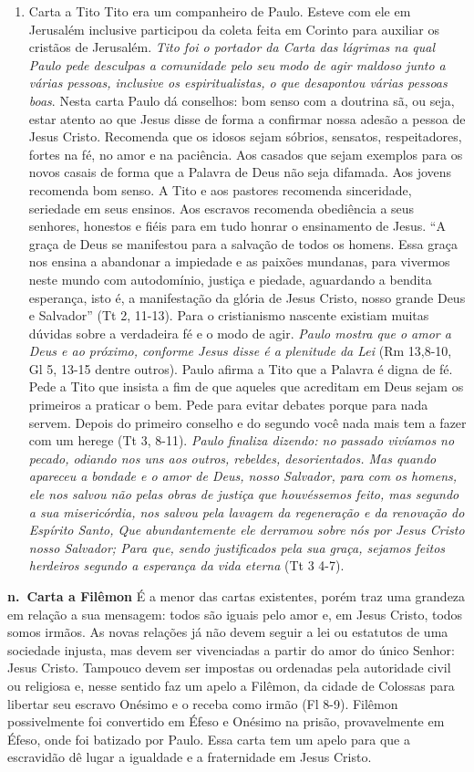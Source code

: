\documentclass[
]{book}
\begin{document}
\begin{enumerate}
\item
  Carta a Tito
  Tito era um companheiro de Paulo. Esteve com ele em Jerusalém inclusive participou da coleta feita em Corinto para auxiliar os cristãos de Jerusalém. \emph{Tito foi o portador da Carta das lágrimas na qual Paulo pede desculpas a comunidade pelo seu modo de agir maldoso junto a várias pessoas, inclusive os espiritualistas, o que desapontou várias pessoas boas}. Nesta carta Paulo dá conselhos: bom senso com a doutrina sã, ou seja, estar atento ao que Jesus disse de forma a confirmar nossa adesão a pessoa de Jesus Cristo. Recomenda que os idosos sejam sóbrios, sensatos, respeitadores, fortes na fé, no amor e na paciência. Aos casados que sejam exemplos para os novos casais de forma que a Palavra de Deus não seja difamada. Aos jovens recomenda bom senso. A Tito e aos pastores recomenda sinceridade, seriedade em seus ensinos. Aos escravos recomenda obediência a seus senhores, honestos e fiéis para em tudo honrar o ensinamento de Jesus. ``A graça de Deus se manifestou para a salvação de todos os homens. Essa graça nos ensina a abandonar a impiedade e as paixões mundanas, para vivermos neste mundo com autodomínio, justiça e piedade, aguardando a bendita esperança, isto é, a manifestação da glória de Jesus Cristo, nosso grande Deus e Salvador'' (Tt 2, 11-13).
  Para o cristianismo nascente existiam muitas dúvidas sobre a verdadeira fé e o modo de agir. \emph{Paulo mostra que o amor a Deus e ao próximo, conforme Jesus disse é a plenitude da Lei} (Rm 13,8-10, Gl 5, 13-15 dentre outros). Paulo afirma a Tito que a Palavra é digna de fé. Pede a Tito que insista a fim de que aqueles que acreditam em Deus sejam os primeiros a praticar o bem. Pede para evitar debates porque para nada servem. Depois do primeiro conselho e do segundo você nada mais tem a fazer com um herege (Tt 3, 8-11). \emph{Paulo finaliza dizendo: no passado vivíamos no pecado, odiando nos uns aos outros, rebeldes, desorientados. Mas quando apareceu a bondade e o amor de Deus, nosso Salvador, para com os homens, ele nos salvou não pelas obras de justiça que houvéssemos feito, mas segundo a sua misericórdia, nos salvou pela lavagem da regeneração e da renovação do Espírito Santo, Que abundantemente ele derramou sobre nós por Jesus Cristo nosso Salvador; Para que, sendo justificados pela sua graça, sejamos feitos herdeiros segundo a esperança da vida eterna} (Tt 3 4-7).
\end{enumerate}

\textbf{n.~Carta a Filêmon}
É a menor das cartas existentes, porém traz uma grandeza em relação a sua mensagem: todos são iguais pelo amor e, em Jesus Cristo, todos somos irmãos. As novas relações já não devem seguir a lei ou estatutos de uma sociedade injusta, mas devem ser vivenciadas a partir do amor do único Senhor: Jesus Cristo. Tampouco devem ser impostas ou ordenadas pela autoridade civil ou religiosa e, nesse sentido faz um apelo a Filêmon, da cidade de Colossas para libertar seu escravo Onésimo e o receba como irmão (Fl 8-9). Filêmon possivelmente foi convertido em Éfeso e Onésimo na prisão, provavelmente em Éfeso, onde foi batizado por Paulo. Essa carta tem um apelo para que a escravidão dê lugar a igualdade e a fraternidade em Jesus Cristo.
\end{document}
